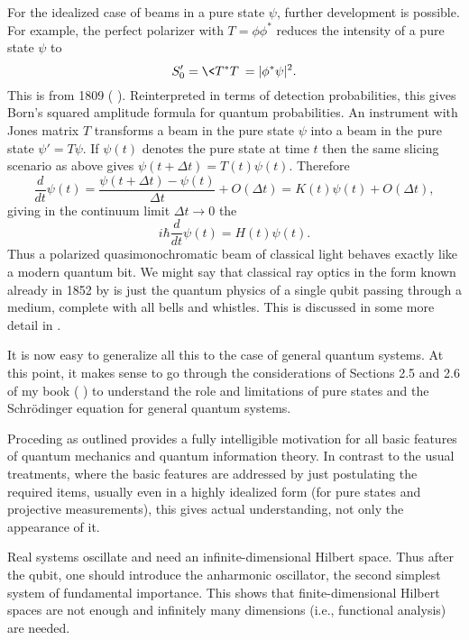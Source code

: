 \documentclass[12pt]{article}
\begin{document}
For the idealized case of beams in a pure state $\psi$, further 
development is possible. For example, the perfect polarizer with 
$T=\phi\phi^*$ reduces the intensity of a pure state $\psi$ to
\[
S_0'=\<T^*T\>=|\phi^*\psi|^2.
\]
This is  from 1809 ( \cite{Mal}). 
Reinterpreted in terms 
of detection probabilities, this gives Born's squared amplitude formula 
for quantum probabilities. An instrument with Jones matrix $T$ 
transforms a beam in the pure state $\psi$ into a beam in the pure 
state $\psi'=T\psi$. If $\psi(t)$ denotes the pure state at time $t$ 
then the same slicing scenario as above gives 
$\psi(t+\Delta t) = T(t) \psi(t)$. Therefore 
\[
\frac{d}{dt}\psi(t)
= \frac{\psi(t+\Delta t)-\psi(t)}{\Delta t}+O(\Delta t)
= K(t) \psi(t)+O(\Delta t),
\]
giving in the continuum limit $\Delta t\to 0$ the 
\[
i\hbar\frac{d}{dt}\psi(t) = H(t) \psi(t).
\]
Thus a polarized quasimonochromatic beam of classical light
behaves exactly like a modern quantum bit. We might say that classical
ray optics in the form known already in 1852 by  \cite{Sto} 
is just the quantum physics of a single qubit passing through a medium,
complete with all bells and whistles. This is discussed in some more 
detail in  \cite{Neu.qubit}.

It is now easy to generalize all this to the case of general quantum 
systems. At this point, it makes sense to go through the considerations 
of Sections 2.5 and 2.6 of my book ( \cite{Neu.CQP}) to 
understand the role and limitations of pure states and the  
Schr\"odinger equation for general quantum systems.

Proceding as outlined provides a fully intelligible motivation for all 
basic features of quantum mechanics and quantum information theory.
In contrast to the usual treatments, where the basic features are
addressed by just postulating the required items, usually even in a 
highly idealized form (for pure states and projective measurements), 
this gives actual understanding, not only the appearance of it.

\bigskip

Real systems oscillate and need an infinite-dimensional Hilbert space.
Thus after the qubit, one should introduce the anharmonic oscillator, 
the second simplest system of fundamental importance. This shows that
finite-dimensional Hilbert spaces are not enough and infinitely many
dimensions (i.e., functional analysis) are needed.
\end{document}
